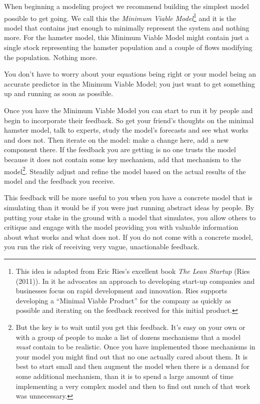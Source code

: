 \documentclass[]{memoir}
\begin{document}
When beginning a modeling project we recommend building the simplest
model possible to get going. We call this the \emph{Minimum Viable
Model}\footnote{This idea is adapted from Eric Ries's excellent book
  \emph{The Lean Startup} (Ries (2011)). In it he advocates an approach
  to developing start-up companies and businesses focus on rapid
  development and innovation. Ries supports developing a ``Minimal
  Viable Product'' for the company as quickly as possible and iterating
  on the feedback received for this initial product.} and it is the
model that contains just enough to minimally represent the system and
nothing more. For the hamster model, this Minimum Viable Model might
contain just a single stock representing the hamster population and a
couple of flows modifying the population. Nothing more.

You don't have to worry about your equations being right or your model
being an accurate predictor in the Minimum Viable Model; you just want
to get something up and running as soon as possible.

Once you have the Minimum Viable Model you can start to run it by people
and begin to incorporate their feedback. So get your friend's thoughts
on the minimal hamster model, talk to experts, study the model's
forecasts and see what works and does not. Then iterate on the model:
make a change here, add a new component there. If the feedback you are
getting is no one trusts the model because it does not contain some key
mechanism, add that mechanism to the model\footnote{But the key is to
  wait until you get this feedback. It's easy on your own or with a
  group of people to make a list of dozens mechanisms that a model
  \emph{must} contain to be realistic. Once you have implemented those
  mechanisms in your model you might find out that no one actually cared
  about them. It is best to start small and then augment the model when
  there is a demand for some additional mechanism, than it is to spend a
  large amount of time implementing a very complex model and then to
  find out much of that work was unnecessary.}. Steadily adjust and
refine the model based on the actual results of the model and the
feedback you receive.

This feedback will be more useful to you when you have a concrete model
that is simulating than it would be if you were just running abstract
ideas by people. By putting your stake in the ground with a model that
simulates, you allow others to critique and engage with the model
providing you with valuable information about what works and what does
not. If you do not come with a concrete model, you run the risk of
receiving very vague, unactionable feedback.
\end{document}
